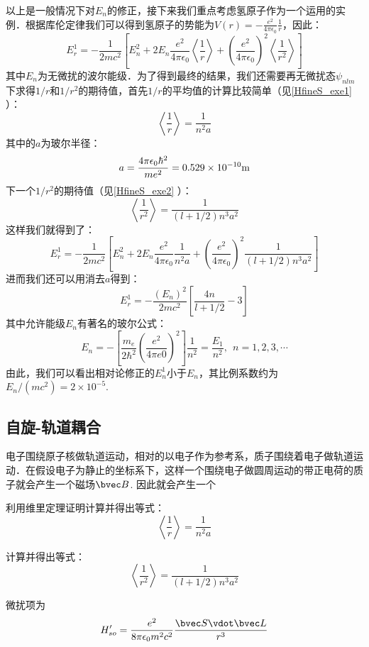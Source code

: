 以上是一般情况下对$E_n$的修正，接下来我们重点考虑氢原子作为一个运用的实例．根据库伦定律我们可以得到氢原子的势能为$V(r)=-\frac{e^2}{4\pi\epsilon_0}\frac{1}{r}$，因此：
\begin{equation}
E_r^1=-\frac{1}{2mc^2}\left[E_n^2+2E_n\frac{e^2}{4\pi\epsilon_0}\left\langle \frac{1}{r}\right\rangle+\left(\frac{e^2}{4\pi\epsilon_0}\right)^2\left\langle \frac{1}{r^2}\right\rangle\right]
\end{equation}
其中$E_n$为无微扰的波尔能级．为了得到最终的结果，我们还需要再无微扰态$\psi_{nlm}$下求得$1/r$和$1/r^2$的期待值，首先$1/r$的平均值的计算比较简单（见\autoref{HfineS_exe1} ）：
\begin{equation}
\left\langle\frac{1}{r}\right\rangle = \frac{1}{n^2a}
\end{equation}
其中的$a$为玻尔半径：
\begin{equation}
a=\frac{4\pi\epsilon_0\hbar^2}{me^2}=0.529\times 10^{-10}\rm{m}
\end{equation}
下一个$1/r^2$的期待值（见\autoref{HfineS_exe2} ）：
\begin{equation}
\left\langle \frac{1}{r^2}\right\rangle = \frac{1}{(l+1/2)n^3a^2}
\end{equation}
这样我们就得到了：
\begin{equation}
E_r^1=-\frac{1}{2mc^2}\left[E_n^2+2E_n\frac{e^2}{4\pi\epsilon_0}\frac{1}{n^2a}+\left(\frac{e^2}{4\pi\epsilon_0}\right)^2\frac{1}{(l+1/2)n^3a^2}\right]
\end{equation}
进而我们还可以用消去$a$得到：
\begin{equation}
E_r^1=-\frac{(E_n)^2}{2mc^2}\left[\frac{4n}{l+1/2}-3\right]
\end{equation}
其中允许能级$E_n$有著名的玻尔公式：
\begin{equation}
E_{n} =-\left[\frac {m_e}{2\hbar^{2}} \left(\frac {e^ {2}}{4\pi e0}\right)^ {2}\right]  \frac {1}{n^ {2}}  =  \frac {E_ {1}}{n^ {2}}, \ \  n=1,2,3, \cdots 
\end{equation}
由此，我们可以看出相对论修正的$E^1_n$小于$E_n$，其比例系数约为$E_n/(mc^2)=2\times 10^{-5}$.

\subsection{自旋-轨道耦合}
电子围绕原子核做轨道运动，相对的以电子作为参考系，质子围绕着电子做轨道运动．在假设电子为静止的坐标系下，这样一个围绕电子做圆周运动的带正电荷的质子就会产生一个磁场$\bvec B$. 因此就会产生一个
\begin{exercise}{}\label{HfineS_exe1}
利用维里定理证明计算并得出等式：
\begin{equation}
\left\langle\frac{1}{r}\right\rangle = \frac{1}{n^2a}
\end{equation}
\end{exercise}
\begin{exercise}{}\label{HfineS_exe2}
计算并得出等式：
\begin{equation}
\left\langle \frac{1}{r^2}\right\rangle = \frac{1}{(l+1/2)n^3a^2}
\end{equation}
\end{exercise}
微扰项为
\begin{equation}
H'_{so} = \frac{e^2}{8\pi \epsilon_0 m^2 c^2} \frac{\bvec S \vdot \bvec L}{r^3}
\end{equation}
